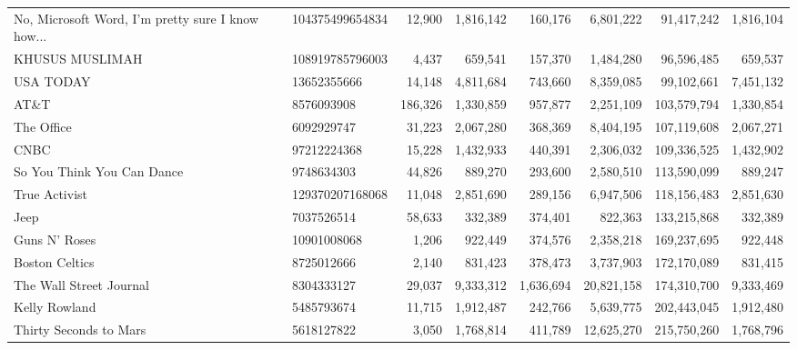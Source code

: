 \begin{longtable}{llrrrrrr}
 No, Microsoft Word, I'm pretty sure I know how... &  104375499654834 &  12,900 &   1,816,142 &    160,176 &   6,801,222 &    91,417,242 &  1,816,104 \\
                                   KHUSUS MUSLIMAH &  108919785796003 &   4,437 &     659,541 &    157,370 &   1,484,280 &    96,596,485 &    659,537 \\
                                         USA TODAY &      13652355666 &  14,148 &   4,811,684 &    743,660 &   8,359,085 &    99,102,661 &  7,451,132 \\
                                             AT\&T &       8576093908 & 186,326 &   1,330,859 &    957,877 &   2,251,109 &   103,579,794 &  1,330,854 \\
                                        The Office &       6092929747 &  31,223 &   2,067,280 &    368,369 &   8,404,195 &   107,119,608 &  2,067,271 \\
                                              CNBC &      97212224368 &  15,228 &   1,432,933 &    440,391 &   2,306,032 &   109,336,525 &  1,432,902 \\
                        So You Think You Can Dance &       9748634303 &  44,826 &     889,270 &    293,600 &   2,580,510 &   113,590,099 &    889,247 \\
                                     True Activist &  129370207168068 &  11,048 &   2,851,690 &    289,156 &   6,947,506 &   118,156,483 &  2,851,630 \\
                                              Jeep &       7037526514 &  58,633 &     332,389 &    374,401 &     822,363 &   133,215,868 &    332,389 \\
                                     Guns N' Roses &      10901008068 &   1,206 &     922,449 &    374,576 &   2,358,218 &   169,237,695 &    922,448 \\
                                    Boston Celtics &       8725012666 &   2,140 &     831,423 &    378,473 &   3,737,903 &   172,170,089 &    831,415 \\
                           The Wall Street Journal &       8304333127 &  29,037 &   9,333,312 &  1,636,694 &  20,821,158 &   174,310,700 &  9,333,469 \\
                                     Kelly Rowland &       5485793674 &  11,715 &   1,912,487 &    242,766 &   5,639,775 &   202,443,045 &  1,912,480 \\
                            Thirty Seconds to Mars &       5618127822 &   3,050 &   1,768,814 &    411,789 &  12,625,270 &   215,750,260 &  1,768,796 \\

\end{longtable}

